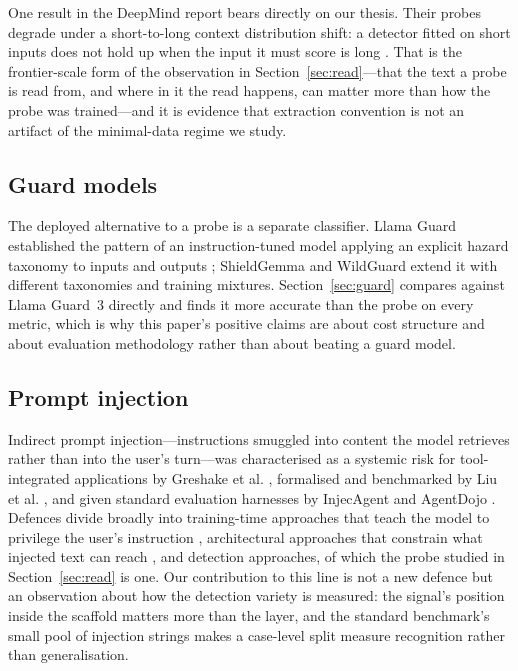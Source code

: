 One result in the DeepMind report bears directly on our thesis. Their probes degrade under a short-to-long context
distribution shift: a detector fitted on short inputs does not hold up when the input it must score is long
\cite{gdm2026probes}. That is the frontier-scale form of the observation in Section~\ref{sec:read}---that the text a
probe is read from, and where in it the read happens, can matter more than how the probe was trained---and it is
evidence that extraction convention is not an artifact of the minimal-data regime we study.

\subsection{Guard models}

The deployed alternative to a probe is a separate classifier. Llama Guard established the pattern of an
instruction-tuned model applying an explicit hazard taxonomy to inputs and outputs \cite{inan2023llama}; ShieldGemma
\cite{zeng2024shieldgemma} and WildGuard \cite{han2024wildguard} extend it with different taxonomies and training
mixtures. Section~\ref{sec:guard} compares against Llama Guard~3 directly and finds it more accurate than the probe on
every metric, which is why this paper's positive claims are about cost structure and about evaluation methodology
rather than about beating a guard model.

\subsection{Prompt injection}

Indirect prompt injection---instructions smuggled into content the model retrieves rather than into the user's
turn---was characterised as a systemic risk for tool-integrated applications by Greshake et al.
\cite{greshake2023youve}, formalised and benchmarked by Liu et al. \cite{liu2024formalizing}, and given standard
evaluation harnesses by InjecAgent \cite{zhan2024injecagent} and AgentDojo \cite{debenedetti2024agentdojo}. Defences
divide broadly into training-time approaches that teach the model to privilege the user's instruction
\cite{wallace2024instruction}, architectural approaches that constrain what injected text can reach
\cite{debenedetti2025camel}, and detection approaches, of which the probe studied in Section~\ref{sec:read} is one.
Our contribution to this line is not a new defence but an observation about how the detection variety is measured: the
signal's position inside the scaffold matters more than the layer, and the standard benchmark's small pool of
injection strings makes a case-level split measure recognition rather than generalisation.


